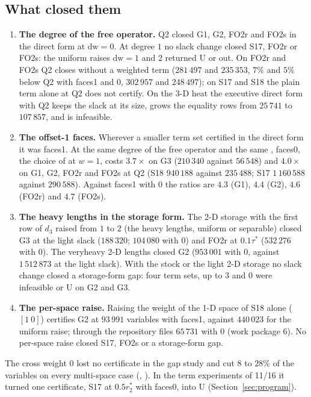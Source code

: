 \subsection{What closed them}\label{sec:gaps-closed}

\begin{enumerate}\setlength\itemsep{0pt}
\item \textbf{The degree of the free operator.} Q2 closed G1, G2, FO2r and FO2s in the direct form at $\mathrm{dw}=0$. At degree $1$ no slack change closed S17, FO2r or FO2s: the uniform raises $\mathrm{dw}=1$ and $2$ returned U or out. On FO2r and FO2s Q2 closes without a weighted term ($281\,497$ and $235\,353$, $7\%$ and $5\%$ below Q2 with faces1 and  $0$, $302\,957$ and $248\,497$); on S17 and S18 the plain term alone at Q2 does not certify. On the 3-D heat the executive direct form with Q2 keeps the slack at its size, grows the equality rows from $25\,741$ to $107\,857$, and is infeasible.
\item \textbf{The offset-1 faces.} Wherever a smaller term set certified in the direct form it was faces1. At the same degree of the free operator and the same , faces0, the choice of  at $w=1$, costs $3.7\times$ on G3 ($210\,340$ against $56\,548$) and $4.0\times$ on G1, G2, FO2r and FO2s at Q2 (S18 $940\,188$ against $235\,488$; S17 $1\,160\,588$ against $290\,588$). Against faces1 with  $0$ the ratios are $4.3$ (G1), $4.4$ (G2), $4.6$ (FO2r) and $4.7$ (FO2s).
\item \textbf{The heavy lengths in the storage form.} The 2-D storage with the first row of $d_3$ raised from $1$ to $2$ (the heavy lengths, uniform or separable) closed G3 at the light slack ($188\,320$; $104\,080$ with  $0$) and FO2r at $0.1\tau^*$ ($532\,276$ with  $0$). The veryheavy 2-D lengths closed G2 ($953\,001$ with  $0$, against $1\,512\,873$ at the light slack). With the stock or the light 2-D storage no slack change closed a storage-form gap: four term sets,  up to $3$ and  $0$ were infeasible or U on G2 and G3.
\item \textbf{The per-space raise.} Raising the weight of the 1-D space of S18 alone ( $[1\ 0]$) certifies G2 at $93\,991$ variables with faces1, against $440\,023$ for the uniform raise; through the repository files $65\,731$ with  $0$ (work package 6). No per-space raise closed S17, FO2s or a storage-form gap.
\end{enumerate}
The cross weight  $0$ lost no certificate in the gap study and cut $8$ to $28\%$ of the variables on every multi-space case (, ). In the term experiments of 11/16 it turned one certificate, S17 at $0.5r_2^*$ with faces0, into U (Section~\ref{sec:program}).

